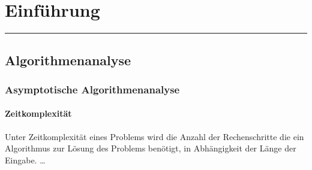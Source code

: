 \section{Einführung}
\rule{\textwidth}{0.4pt}
\subsection{Algorithmenanalyse}
\subsubsection{Asymptotische Algorithmenanalyse}
    \paragraph*{Zeitkomplexität}
    Unter Zeitkomplexität eines Problems wird die Anzahl der Rechenschritte die ein Algorithmus zur Lösung des Problems benötigt, in Abhängigkeit der Länge der Eingabe.
\dots